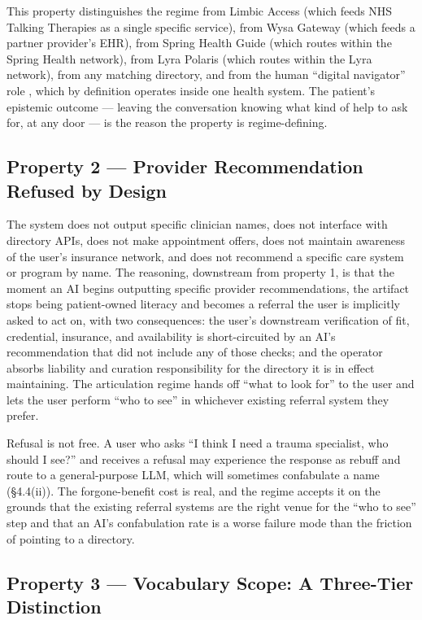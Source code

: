 \documentclass[letterpaper]{article}
\begin{document}
This property distinguishes the regime from Limbic Access (which feeds NHS Talking Therapies as a single specific service), from Wysa Gateway (which feeds a partner provider's EHR), from Spring Health Guide (which routes within the Spring Health network), from Lyra Polaris (which routes within the Lyra network), from any matching directory, and from the human ``digital navigator'' role \citep{wisniewski2022navigator}, which by definition operates inside one health system. The patient's epistemic outcome --- leaving the conversation knowing what kind of help to ask for, at any door --- is the reason the property is regime-defining.

\subsection{Property 2 --- Provider Recommendation Refused by Design}

The system does not output specific clinician names, does not interface with directory APIs, does not make appointment offers, does not maintain awareness of the user's insurance network, and does not recommend a specific care system or program by name. The reasoning, downstream from property 1, is that the moment an AI begins outputting specific provider recommendations, the artifact stops being patient-owned literacy and becomes a referral the user is implicitly asked to act on, with two consequences: the user's downstream verification of fit, credential, insurance, and availability is short-circuited by an AI's recommendation that did not include any of those checks; and the operator absorbs liability and curation responsibility for the directory it is in effect maintaining. The articulation regime hands off ``what to look for'' to the user and lets the user perform ``who to see'' in whichever existing referral system they prefer.

Refusal is not free. A user who asks ``I think I need a trauma specialist, who should I see?'' and receives a refusal may experience the response as rebuff and route to a general-purpose LLM, which will sometimes confabulate a name (\S4.4(ii)). The forgone-benefit cost is real, and the regime accepts it on the grounds that the existing referral systems are the right venue for the ``who to see'' step and that an AI's confabulation rate is a worse failure mode than the friction of pointing to a directory.

\subsection{Property 3 --- Vocabulary Scope: A Three-Tier Distinction}
\end{document}
